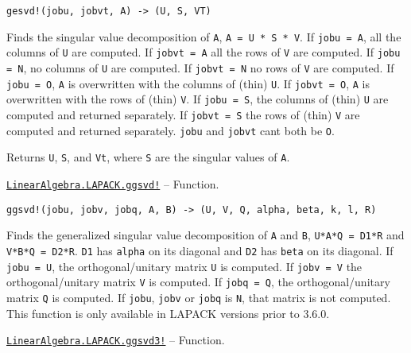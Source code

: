 \begin{adjustwidth}{2em}{0pt}


\begin{verbatim}
gesvd!(jobu, jobvt, A) -> (U, S, VT)
\end{verbatim}

Finds the singular value decomposition of \texttt{A}, \texttt{A = U * S * V{\textquotesingle}}. If \texttt{jobu = A}, all the columns of \texttt{U} are computed. If \texttt{jobvt = A} all the rows of \texttt{V{\textquotesingle}} are computed. If \texttt{jobu = N}, no columns of \texttt{U} are computed. If \texttt{jobvt = N} no rows of \texttt{V{\textquotesingle}} are computed. If \texttt{jobu = O}, \texttt{A} is overwritten with the columns of (thin) \texttt{U}. If \texttt{jobvt = O}, \texttt{A} is overwritten with the rows of (thin) \texttt{V{\textquotesingle}}. If \texttt{jobu = S}, the columns of (thin) \texttt{U} are computed and returned separately. If \texttt{jobvt = S} the rows of (thin) \texttt{V{\textquotesingle}} are computed and returned separately. \texttt{jobu} and \texttt{jobvt} can{\textquotesingle}t both be \texttt{O}.

Returns \texttt{U}, \texttt{S}, and \texttt{Vt}, where \texttt{S} are the singular values of \texttt{A}.



\end{adjustwidth}
\hypertarget{1835214761811297196}{}
\hyperlink{1835214761811297196}{\texttt{LinearAlgebra.LAPACK.ggsvd!}}  -- {Function.}

\begin{adjustwidth}{2em}{0pt}


\begin{verbatim}
ggsvd!(jobu, jobv, jobq, A, B) -> (U, V, Q, alpha, beta, k, l, R)
\end{verbatim}

Finds the generalized singular value decomposition of \texttt{A} and \texttt{B}, \texttt{U{\textquotesingle}*A*Q = D1*R} and \texttt{V{\textquotesingle}*B*Q = D2*R}. \texttt{D1} has \texttt{alpha} on its diagonal and \texttt{D2} has \texttt{beta} on its diagonal. If \texttt{jobu = U}, the orthogonal/unitary matrix \texttt{U} is computed. If \texttt{jobv = V} the orthogonal/unitary matrix \texttt{V} is computed. If \texttt{jobq = Q}, the orthogonal/unitary matrix \texttt{Q} is computed. If \texttt{jobu}, \texttt{jobv} or \texttt{jobq} is \texttt{N}, that matrix is not computed. This function is only available in LAPACK versions prior to 3.6.0.



\end{adjustwidth}
\hypertarget{14749391167207110611}{}
\hyperlink{14749391167207110611}{\texttt{LinearAlgebra.LAPACK.ggsvd3!}}  -- {Function.}

